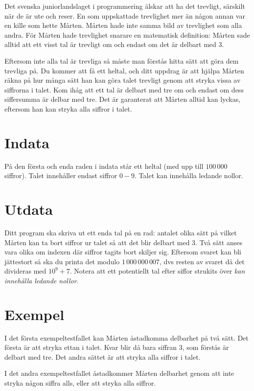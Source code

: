 Det svenska juniorlandslaget i programmering älskar att ha det trevligt, särskilt när de är ute och reser. En som uppskattade trevlighet mer än någon annan var en kille som hette Mårten. Mårten hade inte samma bild av trevlighet som alla andra. För Mårten hade trevlighet snarare en matematisk definition: Mårten sade alltid att ett visst tal är trevligt om och endast om det är delbart med 3.

Eftersom inte alla tal är trevliga så måste man förstås hitta sätt att göra dem trevliga på. Du kommer att få ett heltal, och ditt uppdrag är att hjälpa Mårten räkna på hur många sätt han kan göra talet trevligt genom att stryka vissa av siffrorna i talet. Kom ihåg att ett tal är delbart med tre om och endast om dess siffersumma är delbar med tre. Det är garanterat att Mårten alltid kan lyckas, eftersom han kan stryka alla siffror i talet.

\section*{Indata}
På den första och enda raden i indata står ett heltal (med upp till $100\,000$ siffror). Talet innehåller endast siffror $0-9$. Talet kan innehålla ledande nollor.

\section*{Utdata}
Ditt program ska skriva ut ett enda tal på en rad: antalet olika sätt på vilket Mårten kan ta bort siffror ur talet så att det blir delbart med 3. Två sätt anses vara olika om indexen där siffror tagits bort skiljer sig. Eftersom svaret kan bli jättestort så ska du printa det modulo $1\,000\,000\,007$, dvs resten av svaret då det divideras med $10^9 + 7$. Notera att ett potentiellt tal efter siffor strukits över \emph{kan innehålla ledande nollor}.

\section*{Exempel}
I det första exempeltestfallet kan Mårten åstadkomma delbarhet på två sätt. Det första är att stryka ettan i talet. Kvar blir då bara siffran 3, som förstås är delbart med tre. Det andra sättet är att stryka alla siffror i talet.

I det andra exempeltestfallet åstadkommer Mårten delbarhet genom att inte stryka någon siffra alls, eller att stryka alla siffror.


